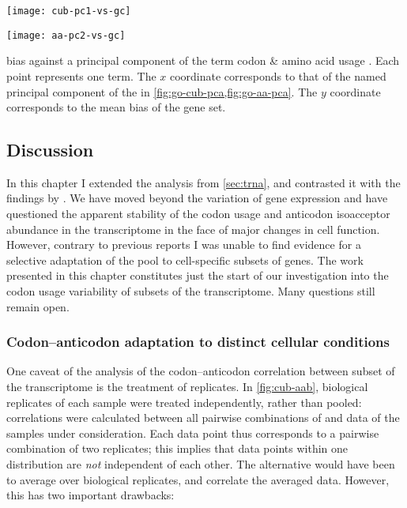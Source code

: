     {%
        \begin{minipage}{0.5\textwidth}
            \texttt{[image: cub-pc1-vs-gc]}%
        \end{minipage}%
        \begin{minipage}{0.5\textwidth}
            \texttt{[image: aa-pc2-vs-gc]}%
        \end{minipage}%
    }
    {\gc bias against a principal component of the \go term codon \& amino acid
    usage \pca.}
    {Each point represents one \go term. The \(x\) coordinate corresponds to
    that of the named principal component of the \pca in
    \cref{fig:go-cub-pca,fig:go-aa-pca}. The \(y\) coordinate corresponds to
    the mean \gc bias of the \go gene set.}

\subsection{Discussion}

In this chapter I extended the analysis from \cref{sec:trna}, and contrasted it
with the findings by \citet{Gingold:2014}. We have moved beyond the variation of
\trna gene expression and have questioned the apparent stability of the codon
usage and anticodon isoacceptor abundance in the transcriptome in the face of
major changes in cell function. However, contrary to previous reports I was
unable to find evidence for a selective adaptation of the \trna pool to
cell-specific subsets of genes. The work presented in this chapter constitutes
just the start of our investigation into the codon usage variability of subsets
of the transcriptome. Many questions still remain open.

\subsubsection{Codon--anticodon adaptation to distinct cellular conditions}

One caveat of the analysis of the codon--anticodon correlation between subset of
the transcriptome is the treatment of replicates. In \cref{fig:cub-aab},
biological replicates of each sample were treated independently, rather than
pooled: correlations were calculated between all pairwise combinations of
\rnaseq and  \chipseq data of the samples under consideration. Each data
point thus corresponds to a pairwise combination of two replicates; this implies
that data points within one distribution are \emph{not} independent of each
other. The alternative would have been to average over biological replicates,
and correlate the averaged data. However, this has two important drawbacks:

